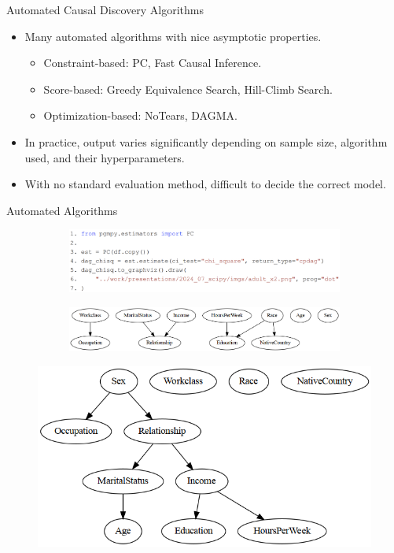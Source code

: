 \documentclass{beamer}
\begin{document}
\begin{frame}{Automated Causal Discovery Algorithms}
	\begin{itemize}
		\item Many automated algorithms with nice asymptotic properties.
			\begin{itemize}
				\item Constraint-based: PC, Fast Causal Inference.
				\item Score-based: Greedy Equivalence Search, Hill-Climb Search.
				\item Optimization-based: NoTears, DAGMA.
			\end{itemize}
		\item In practice, output varies significantly depending on sample size,
			algorithm used, and their hyperparameters.
		\item With no standard evaluation method, difficult to decide the correct model.
	\end{itemize}
\end{frame}

\begin{frame}{Automated Algorithms}
	\begin{figure}
		\centering
		\begin{subfigure}{0.5\textwidth}
			\includegraphics[scale=0.2]{imgs/pc_x2.png}
		\end{subfigure}%
		\begin{subfigure}{0.5\textwidth}
			\includegraphics[scale=0.25]{imgs/adult_x2.png}
		\end{subfigure}
	\end{figure}
	\begin{figure}
		\centering
		\includegraphics[scale=0.25]{imgs/adult_bic.png}
	\end{figure}
\end{frame}
\end{document}
